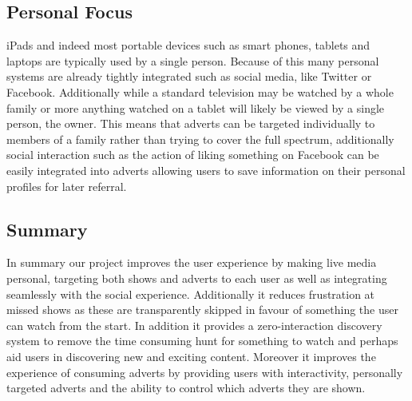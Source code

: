 \subsection{Personal Focus}
iPads and indeed most portable devices such as smart phones, tablets and laptops are typically used by a single person. Because of this many personal systems are already tightly integrated such as social media, like Twitter or Facebook. Additionally while a standard television may be watched by a whole family or more anything watched on a tablet will likely be viewed by a single person, the owner. This means that adverts can be targeted individually to members of a family rather than trying to cover the full spectrum, additionally social interaction such as the action of liking something on Facebook can be easily integrated into adverts allowing users to save information on their personal profiles for later referral.

\subsection{Summary}
In summary our project improves the user experience by making live media personal, targeting both shows and adverts to each user as well as integrating seamlessly with the social experience. Additionally it reduces frustration at missed shows as these are transparently skipped in favour of something the user can watch from the start. In addition it provides a zero-interaction discovery system to remove the time consuming hunt for something to watch and perhaps aid users in discovering new and exciting content. Moreover it improves the experience of consuming adverts by providing users with interactivity, personally targeted adverts and the ability to control which adverts they are shown. 